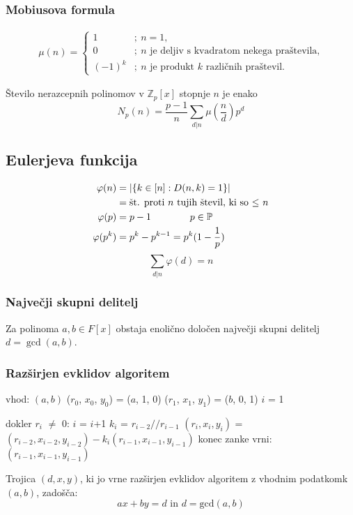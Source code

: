	\subsubsection*{Mobiusova formula}
	\begin{align*}
		\mu(n) = \begin{cases}
			1 &;\ n = 1, \\
			0 &;\ \text{$n$ je deljiv s kvadratom nekega praštevila,} \\
			(-1)^k &;\ \text{$n$ je produkt $k$ različnih praštevil.}
		\end{cases}
	\end{align*}

	Število nerazcepnih polinomov v $\mathbb{Z}_p[x]$ stopnje $n$ je enako
	\[ N_p(n) = \frac{p-1}{n} \sum_{d|n} \mu(\frac{n}{d}) p^d\]

	\subsection*{Eulerjeva funkcija}
	\[ 
		\begin{aligned}
			\varphi (n) &= |\{k\in [n] : D(n,k) = 1 \}| \\
					&= \textmd{št. proti $n$ tujih števil, ki so $\leq$ $n$} \\
			\varphi(p) &= p-1 \qquad \qquad p \in \mathbb{P}\\
			\varphi(p^k) &= p^k-p^{k-1} = p^k(1-\frac{1}{p})\\
		\end{aligned}
	\]
	\[\sum_{d|n} \varphi(d) = n\]

	\subsubsection*{Največji skupni delitelj}
	Za polinoma $a,b \in F[x]$ obstaja enolično določen največji skupni delitelj $d = \gcd(a,b)$.
	\subsubsection*{Razširjen evklidov algoritem}
\begin{algorithm}
vhod: $(a, b)$
($r_0$, $x_0$, $y_0$) = ($a$, 1, 0)
($r_1$, $x_1$, $y_1$) = ($b$, 0, 1)
$i$ = 1

dokler $r_i$ $\neq$ 0:
	$i$ = $i$+1
	$k_i$ = $r_{i-2} // r_{i-1}$
	$(r_i, x_i, y_i)$ = $(r_{i-2}, x_{i-2}, y_{i-2}) - k_i(r_{i-1}, x_{i-1}, y_{i-1})$
konec zanke
vrni: $(r_{i-1}, x_{i-1}, y_{i-1})$
\end{algorithm}

	Trojica $(d, x, y)$, ki jo vrne razširjen evklidov algoritem z vhodnim podatkomk $(a, b)$, zadošča:
	\[ax + by = d \text{ in } d = \textrm{gcd}(a, b)\] 

